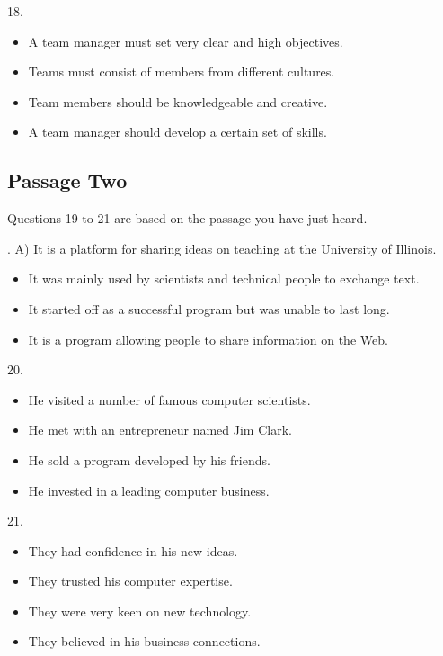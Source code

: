 \documentclass[UTF8,11pt]{ctexart}
\begin{document}
18.


\begin{itemize}[leftmargin=2em,itemsep=.2em,topsep=.4em]\item[A.] A team manager must set very clear and high objectives.
\item[B.] Teams must consist of members from different cultures.
\item[C.] Team members should be knowledgeable and creative.
\item[D.] A team manager should develop a certain set of skills.
\end{itemize}

\subsection*{Passage Two}


Questions 19 to 21 are based on the passage you have just heard.


. A) It is a platform for sharing ideas on teaching at the University of Illinois.


\begin{itemize}[leftmargin=2em,itemsep=.2em,topsep=.4em]\item[B.] It was mainly used by scientists and technical people to exchange text.
\end{itemize}

\begin{itemize}[leftmargin=2em,itemsep=.2em,topsep=.4em]\item[C.] It started off as a successful program but was unable to last long.
\item[D.] It is a program allowing people to share information on the Web.
\end{itemize}

20.


\begin{itemize}[leftmargin=2em,itemsep=.2em,topsep=.4em]\item[A.] He visited a number of famous computer scientists.
\item[B.] He met with an entrepreneur named Jim Clark.
\item[C.] He sold a program developed by his friends.
\item[D.] He invested in a leading computer business.
\end{itemize}

21.


\begin{itemize}[leftmargin=2em,itemsep=.2em,topsep=.4em]\item[A.] They had confidence in his new ideas.
\item[B.] They trusted his computer expertise.
\item[C.] They were very keen on new technology.
\item[D.] They believed in his business connections.
\end{itemize}
\end{document}
